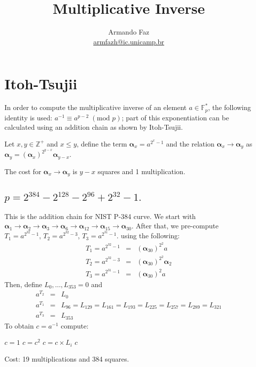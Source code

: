\documentclass{article}
\title{Multiplicative Inverse}
\author{Armando Faz\\\footnotesize{\url{armfazh@ic.unicamp.br}}}
\date{}
\begin{document}
\maketitle

\section{Itoh-Tsujii}
 In order to compute the multiplicative inverse 
of an element $a\in \mathbb{F}_p^*$, the following identity is used: $a^{-1}\equiv 
a^{p-2}\; (\textrm{mod }p)$; part of this exponentiation can be calculated using an addition chain as shown by Itoh-Tsujii.

Let $x,y\in \mathbb{Z}^+$ and $x\leq y$, define the term $\bm{\alpha}_{x} = a^{2^x-1}$ and the relation $\bm{\alpha}_x\rightarrow \bm{\alpha}_y$ as $\bm{\alpha}_{y}=(\bm{\alpha}_x)^{2^{y-x}}\bm{\alpha}_{y-x}$.

The cost for $\bm{\alpha}_x\rightarrow \bm{\alpha}_y$ is $y-x$ squares and 1 multiplication.


\subsection{$p=2^{384}-2^{128}-2^{96}+2^{32}-1.$}
This is the addition chain for NIST P-384 curve. We start with $
\bm{\alpha}_{1} \rightarrow \bm{\alpha}_{2}  \rightarrow \bm{\alpha}_{3}  \rightarrow 
\bm{\alpha}_{6} \rightarrow \bm{\alpha}_{12} \rightarrow \bm{\alpha}_{15} \rightarrow 
\bm{\alpha}_{30}$. After that, we pre-compute $T_1 = a^{2^{32}-1}$, $T_2 = a^{2^{32}-3}$, $T_3 = a^{2^{31}-1}$.
using the following:
\begin{eqnarray*}
 T_1 = a^{2^{32}-1} &=& (\bm{\alpha}_{30})^{2^2}a \\
 T_2 = a^{2^{32}-3} &=& (\bm{\alpha}_{30})^{2^2}\bm{\alpha}_2 \\
 T_3 = a^{2^{31}-1} &=& (\bm{\alpha}_{30})^{2}a 
\end{eqnarray*}
Then, define  $L_{0},\dots,L_{353}= 0$ and 
\begin{eqnarray*}
 a^{T_2} &=& L_{0  } \\
 a^{T_1} &=& L_{96 } = 
 L_{129} = 
 L_{161} = 
 L_{193} = 
 L_{225} = 
 L_{257} = 
 L_{289} = 
 L_{321} \\
 a^{T_3} &=& L_{353}
\end{eqnarray*}
To obtain $c =a^{-1}$ compute:
\begin{algorithmic}
 \STATE $c = 1$
	\STATE $c= c^2$
		\STATE  $c = c\times L_i$
	\ENDIF
 \ENDFOR
 \RETURN $c$
\end{algorithmic}
Cost: 19 multiplications and 384 squares.
\end{document}
